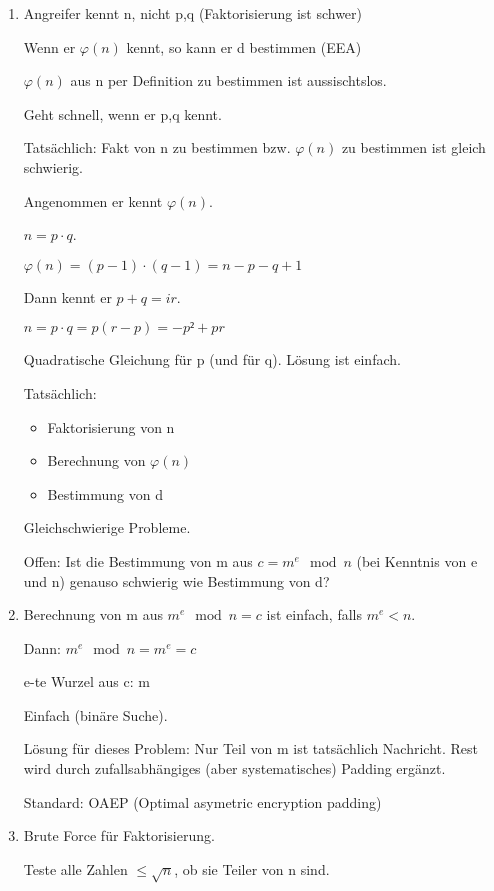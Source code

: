 \begin{enumerate}[label=(\alph*)]
  \item Angreifer kennt n, nicht p,q (Faktorisierung ist schwer)

  Wenn er $\varphi(n)$ kennt, so kann er d bestimmen (EEA)

  $\varphi(n)$ aus n per Definition zu bestimmen ist aussischtslos.

  Geht schnell, wenn er p,q kennt.

  Tatsächlich: Fakt von n zu bestimmen bzw. $\varphi(n)$ zu bestimmen ist gleich schwierig.

  Angenommen er kennt $\varphi(n)$.

  $n = p \cdot q$.

  $\varphi(n) = (p-1) \cdot (q-1) = n-p-q +1$

  Dann kennt er $p+q = ir$.

  $n = p \cdot q = p (r-p) = -p² + pr$

  Quadratische Gleichung für p (und für q). Lösung ist einfach.

  Tatsächlich:

  \begin{itemize}
    \item Faktorisierung von n
    \item Berechnung von $\varphi(n)$
    \item Bestimmung von d
  \end{itemize}

  Gleichschwierige Probleme.

  Offen: Ist die Bestimmung von m aus $c = m^e \mod n$ (bei Kenntnis von e und n) genauso schwierig wie Bestimmung von d?

  \item Berechnung von m aus $m^e \mod n = c$ ist einfach, falls $m^e < n$.

  Dann: $m^e \mod n = m^e = c$

  e-te Wurzel aus c: m

  Einfach (binäre Suche).

  Lösung für dieses Problem: Nur Teil von m ist tatsächlich Nachricht. Rest wird durch zufallsabhängiges (aber systematisches) Padding ergänzt.

  Standard: OAEP (Optimal asymetric encryption padding)

  \item Brute Force für Faktorisierung.

  Teste alle Zahlen $\le \sqrt{n}$, ob sie Teiler von n sind.


\end{enumerate}
